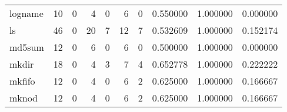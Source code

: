 \begin{tabular}{lrrrrrrrrr}
logname   &                                       10 &                                                  0 &                                                  4 &                                                  0 &                                                  6 &                                                  0 &                                           0.550000 &                               1.000000 &                             0.000000 \\
ls        &                                       46 &                                                  0 &                                                 20 &                                                  7 &                                                 12 &                                                  7 &                                           0.532609 &                               1.000000 &                             0.152174 \\
md5sum    &                                       12 &                                                  0 &                                                  6 &                                                  0 &                                                  6 &                                                  0 &                                           0.500000 &                               1.000000 &                             0.000000 \\
mkdir     &                                       18 &                                                  0 &                                                  4 &                                                  3 &                                                  7 &                                                  4 &                                           0.652778 &                               1.000000 &                             0.222222 \\
mkfifo    &                                       12 &                                                  0 &                                                  4 &                                                  0 &                                                  6 &                                                  2 &                                           0.625000 &                               1.000000 &                             0.166667 \\
mknod     &                                       12 &                                                  0 &                                                  4 &                                                  0 &                                                  6 &                                                  2 &                                           0.625000 &                               1.000000 &                             0.166667 \\

\end{tabular}
